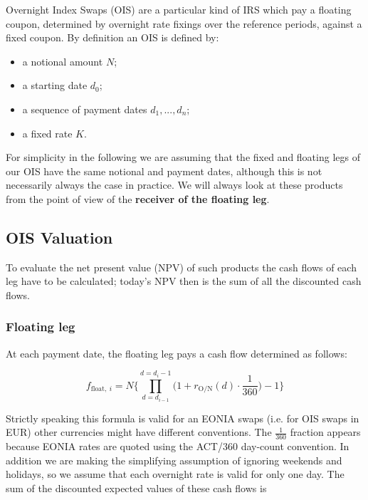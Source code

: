Overnight Index Swaps (OIS) are a particular kind of IRS which pay a
floating coupon, determined by overnight rate fixings over the reference
periods, against a fixed coupon. By definition an OIS is defined by:

\begin{itemize}
\tightlist
\item
  a notional amount \(N\);
\item
  a starting date \(d_0\);
\item
  a sequence of payment dates \(d_1,...,d_n\);
\item
  a fixed rate \(K\).
\end{itemize}

For simplicity in the following we are assuming that the fixed and floating legs of our OIS have the same notional and payment dates, although this is not necessarily always the case in practice. We will always look at these products from the point of view of the \textbf{receiver of the floating leg}.

\subsection{OIS Valuation}\label{ois-valuation}
To evaluate the net present value (NPV) of such products the cash flows of each leg have to be calculated; today's NPV then is the sum of all the discounted cash flows.

\subsubsection{Floating leg}\label{floating-leg}

At each payment date, the floating leg pays a cash flow determined as follows:

\begin{equation}
f_{\mathrm{float},~i} = N \Bigg\{\prod_{d=d_{i-1}}^{d=d_i-1}\Big(1+r_{\mathrm{O/N}}(d)\cdot\frac{1}{360}\Big) -1 \Bigg\}
\label{eq:floating_ois}
\end{equation}

Strictly speaking this formula is valid for an EONIA swaps (i.e. for OIS swaps in EUR) other currencies might have different conventions. The \(\frac{1}{360}\) fraction appears because EONIA rates are quoted using the ACT/360 day-count convention. In addition we are making the simplifying assumption of ignoring weekends and holidays, so we assume that each overnight rate is valid for only one day. The sum of the discounted expected values of these cash flows is


